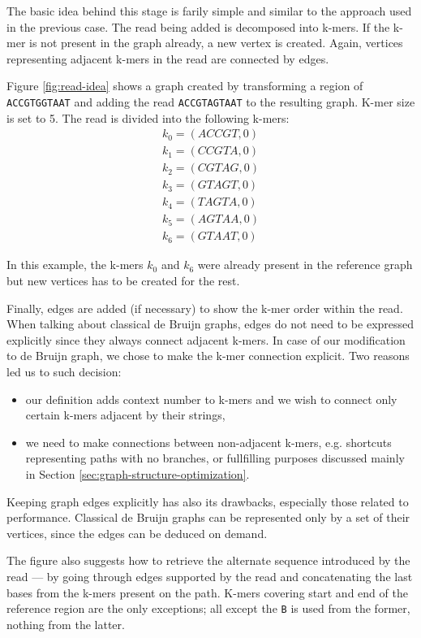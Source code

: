 The basic idea behind this stage is farily simple and similar to the approach used in the previous case. The read being added is decomposed into k-mers. If the k-mer is not present in the graph already, a new vertex is created. Again, vertices representing adjacent k-mers in the read are connected by edges. 

Figure \ref{fig:read-idea} shows a graph created by transforming a region of \texttt{ACCGTGGTAAT} and adding the read \texttt{ACCGTAGTAAT} to the resulting graph. K-mer size is set to 5. The read is divided into the following k-mers:
\begin{align*}
k_0 = (ACCGT, 0) \\
k_1 = (CCGTA, 0) \\
k_2 = (CGTAG, 0) \\
k_3 = (GTAGT, 0) \\
k_4 = (TAGTA, 0) \\
k_5 = (AGTAA, 0) \\
k_6 = (GTAAT, 0)
\end{align*}

In this example, the k-mers $k_0$ and $k_6$ were already present in the reference graph but new vertices has to be created for the rest.

Finally, edges are added (if necessary) to show the k-mer order within the read. When talking about classical de Bruijn graphs, edges do not need to be expressed explicitly since they always connect adjacent k-mers. In case of our modification to de Bruijn graph, we chose to make the k-mer connection explicit. Two reasons led us to such decision:
\begin{itemize}
\item our definition adds context number to k-mers and we wish to connect only certain k-mers adjacent by their strings,
\item we need to make connections between non-adjacent k-mers, e.g. shortcuts representing paths with no branches, or fullfilling purposes discussed mainly in Section \ref{sec:graph-structure-optimization}.
\end{itemize}
Keeping graph edges explicitly has also its drawbacks, especially those related to performance. Classical de Bruijn graphs can be represented only by a set of their vertices, since the edges can be deduced on demand.

The figure also suggests how to retrieve the alternate sequence introduced by the read --- by going through edges supported by the read and concatenating the last bases from the k-mers present on the path. K-mers covering start and end of the reference region are the only exceptions; all except the \texttt{B} is used from the former, nothing from the latter.

